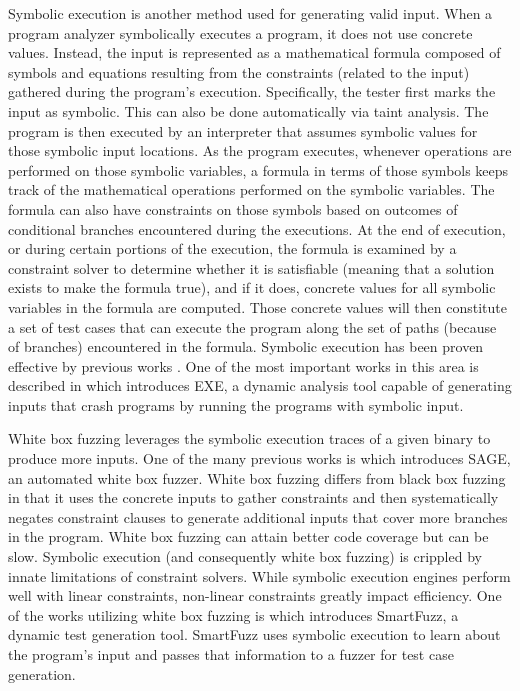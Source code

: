 \documentclass{acm_proc_article-sp}
\begin{document}
Symbolic execution is another method used for generating valid input.
When a program analyzer symbolically executes a program, it does not use concrete values.
Instead, the input is represented as a mathematical formula composed of symbols and equations resulting from the constraints (related to the input) gathered during the program's execution.
Specifically, the tester first marks the input as symbolic.
This can also be done automatically via taint analysis.
The program is then executed by an interpreter that assumes symbolic values for those symbolic input locations.
As the program executes, whenever operations are performed on those symbolic variables, a formula in terms of those symbols keeps track of the mathematical operations performed on the symbolic variables.
The formula can also have constraints on those symbols based on outcomes of conditional branches encountered during the executions.
At the end of execution, or during certain portions of the execution, the formula is examined by a constraint solver to determine whether it is satisfiable (meaning that a solution exists to make the formula true), and if it does, concrete values for all symbolic variables in the formula are computed.
Those concrete values will then constitute a set of test cases that can execute the program along the set of paths (because of branches) encountered in the formula.
Symbolic execution has been proven effective by previous works \cite{symbolicexecution, exesymex}.
One of the most important works in this area is described in \cite{exesymex} which introduces EXE, a dynamic analysis tool capable of generating inputs that crash programs by running the programs with symbolic input.

White box fuzzing leverages the symbolic execution traces of a given binary to produce more inputs.
One of the many previous works is \cite{godefroid2008automated} which introduces SAGE, an automated white box fuzzer.
White box fuzzing differs from black box fuzzing in that it uses the concrete inputs to gather constraints and then systematically negates constraint clauses to generate additional inputs that cover more branches in the program.
White box fuzzing can attain better code coverage but can be slow.
Symbolic execution (and consequently white box fuzzing) is crippled by innate limitations of constraint solvers.
While symbolic execution engines perform well with linear constraints, non-linear constraints greatly impact efficiency.
One of the works utilizing white box fuzzing is \cite{molnar2009dynamic} which introduces SmartFuzz, a dynamic test generation tool.
SmartFuzz uses symbolic execution to learn about the program's input and passes that information to a fuzzer for test case generation.
\end{document}
